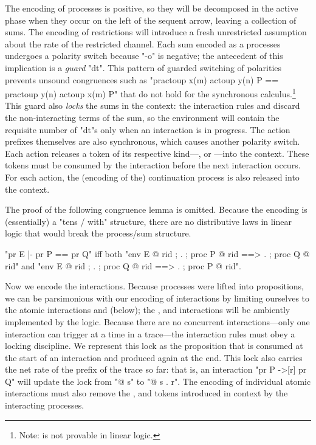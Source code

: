 \documentclass{article}
\begin{document}
The encoding of processes is positive, so they will be decomposed in the active
phase when they occur on the left of the sequent arrow, leaving a collection of
sums.  The encoding of restrictions will introduce a fresh unrestricted
assumption about the rate of the restricted channel. Each sum encoded as a
processes undergoes a polarity switch because "-o" is negative; the antecedent
of this implication is a \emph{guard} "dt". This pattern of guarded switching of
polarities prevents unsound congruences such as "pr{act{oup x(m)} act{oup y(n)}
  P} == pr{act{oup y(n)} act{oup x(m)} P}" that do not hold for the synchronous
 calculus.\footnote{Note:  is not provable in linear logic.}  This guard also
\emph{locks} the sums in the context: the \spi interaction rules  and
 discard the non-interacting terms of the sum, so the environment will
contain the requisite number of "dt"s only when an interaction is in progress.
The action prefixes themselves are also synchronous, which causes another
polarity switch. Each action releases a token of its respective kind---,
 or ---into the context. 
These tokens must be consumed by the interaction before 
the next interaction occurs.
For each action, 
the (encoding of the) continuation process is also released into the context.

The proof of the following congruence lemma is omitted. Because the encoding is
(essentially) a "tens / with" structure, there are no distributive laws in
linear logic that would break the process/sum structure.

\begin{thm}[congruence] 
  \label{thm:congr} \hfill\break
  "pr E |- pr P == pr Q" iff both "env E @ rid ; . ; proc P @ rid ==> . ; proc Q @ rid" 
  and "env E @ rid ; . ; proc Q @ rid ==> . ; proc P @ rid".
\end{thm}

Now we encode the interactions. Because processes were lifted into propositions,
we can be parsimonious with our encoding of interactions by limiting ourselves
to the atomic interactions  and  (below); the ,
 and  interactions will be ambiently implemented by the
logic. Because there are no concurrent interactions---only one interaction can
trigger at a time in a trace---the interaction rules must obey a locking
discipline. We represent this lock as the proposition \cact that is consumed at
the start of an interaction and produced again at the end. This lock also
carries the net rate of the prefix of the trace so far: that is, an interaction
"pr P ->[r] pr Q" will update the lock from "\cact @ s" to "\cact @ {s .
  r}". The encoding of individual atomic interactions must also remove the
,  and  tokens introduced in context by the interacting
processes.
\end{document}
